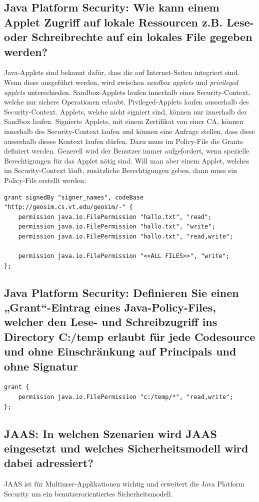 \subsection{Java Platform Security: Wie kann einem Applet Zugriff auf lokale Ressourcen z.B. Lese- oder Schreibrechte auf ein lokales File gegeben werden?}
Java-Applets sind bekannt dafür, dass die auf Internet-Seiten integriert sind. Wenn diese ausgeführt werden, wird zwischen \emph{sandbox applets} und \emph{privileged applets} unterschieden. Sandbox-Applets laufen innerhalb eines Security-Context, welche nur sichere Operationen erlaubt. Pivileged-Applets laufen ausserhalb des Security-Context. Applets, welche nicht signiert sind, können nur innerhalb der Sandbox laufen. Signierte Applets, mit einem Zertifikat von einer CA, können innerhalb des Security-Context laufen und können eine Anfrage stellen, dass diese ausserhalb dieses Kontext laufen dürfen. Dazu muss im Policy-File die Grants definiert werden. Generell wird der Benutzer immer aufgefordert, wenn spezielle Berechtigungen für das Applet nötig sind. Will man aber einem Applet, welches im Security-Context läuft, zusätzliche Berechtigungen geben, dann muss ein Policy-File erstellt werden:

\begin{lstlisting}
grant signedBy "signer_names", codeBase "http://geosim.cs.vt.edu/geosim/-" {
	permission java.io.FilePermission "hallo.txt", "read";
	permission java.io.FilePermission "hallo.txt", "write";
	permission java.io.FilePermission "hallo.txt", "read,write";
	
	permission java.io.FilePermission "<<ALL FILES>>", "write";
};
\end{lstlisting}

\subsection{Java Platform Security: Definieren Sie einen „Grant“-Eintrag eines Java-Policy-Files, welcher den Lese- und Schreibzugriff ins Directory C:/temp erlaubt für jede Codesource und ohne Einschränkung auf Principals und ohne Signatur}

\begin{lstlisting}
grant {
	permission java.io.FilePermission "c:/temp/*", "read,write";
};
\end{lstlisting}

\subsection{JAAS: In welchen Szenarien wird JAAS eingesetzt und welches Sicherheitsmodell wird dabei adressiert?}
JAAS ist für Multiuser-Applikationen wichtig und erweitert die Java Platform Security um ein benutzerorientiertes Sicherheitsmodell.

